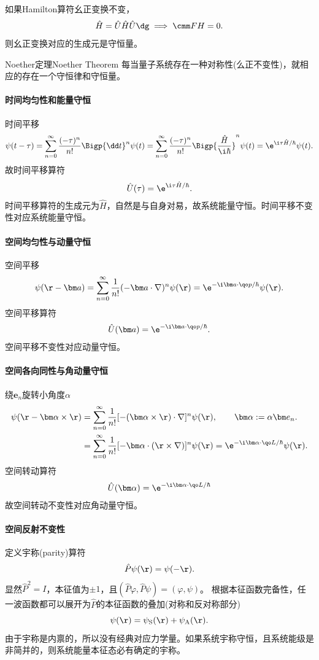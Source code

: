 如果Hamilton算符幺正变换不变，
\[
	\hat H=\hat U\hat H\hat U\dg\implies\cmm FH=0.
\]
则幺正变换对应的生成元是守恒量。
\begin{theorem}{Noether定理}{Noether Theorem}
	每当量子系统存在一种对称性(么正不变性)，就相应的存在一个守恒律和守恒量。
\end{theorem}
\paragraph{时间均匀性和能量守恒}时间平移
\[
	\psi(t-\tau)=\sum_{n=0}^\infty\frac{(-\tau)^n}{n!}\Bigp{\dd t}^n\psi(t)=\sum_{n=0}^\infty\frac{(-\tau)^n}{n!}\Bigp{\frac{\hat H}{\i\hbar}}^n\psi(t)=\e^{\i\tau\hat H/\hbar}\psi(t).
\]
故时间平移算符
\begin{align}
	\hat U(\tau)=\e^{\i\tau\hat H/\hbar}.
\end{align}
时间平移算符的生成元为$\hat H$，自然是与自身对易，故系统能量守恒。时间平移不变性对应系统能量守恒。
\paragraph{空间均匀性与动量守恒}空间平移
\[
	\psi(\r-\bm a)=\sum_{n=0}^\infty\frac{1}{n!}(-\bm a\cdot\nabla)^n\psi(\r)=\e^{-\i\bm a\cdot\qo p/\hbar}\psi(\r).
\]
空间平移算符
\begin{align}
	\hat U(\bm a)=\e^{-\i\bm a\cdot\qo p/\hbar}.
\end{align}
空间平移不变性对应动量守恒。
\paragraph{空间各向同性与角动量守恒}绕$\bm e_n$旋转小角度$\alpha$
\begin{align*}
	\psi(\r-\bm\alpha\times\r)&=\sum_{n=0}^\infty\frac{1}{n!}[-(\bm\alpha\times\r)\cdot\nabla]^n\psi(\r),\qquad\bm\alpha:=\alpha\bm e_n.\\
	&=\sum_{n=0}^\infty\frac{1}{n!}[-\bm\alpha\cdot(\r\times\nabla)]^n\psi(\r)=\e^{-\i\bm\alpha\cdot\qo L/\hbar}\psi(\r).
\end{align*}
空间转动算符
\begin{align}
	\hat U(\bm\alpha)=\e^{-\i\bm\alpha\cdot\qo L/\hbar}
\end{align}
故空间转动不变性对应角动量守恒。
\paragraph{空间反射不变性}定义宇称(parity)算符
\begin{align}
	\hat P\psi(\r)=\psi(-\r).
\end{align}
显然$\hat P^2=I$，本征值为$\pm 1$，且$(\hat P\varphi,\hat P\psi)=(\varphi,\psi)$。
根据本征函数完备性，任一波函数都可以展开为$\hat P$的本征函数的叠加(对称和反对称部分)\[
	\psi(\r)=\psi_\mathrm S(\r)+\psi_\mathrm A(\r).
\]
由于宇称是内禀的，所以没有经典对应力学量。如果系统宇称守恒，且系统能级是非简并的，则系统能量本征态必有确定的宇称。

